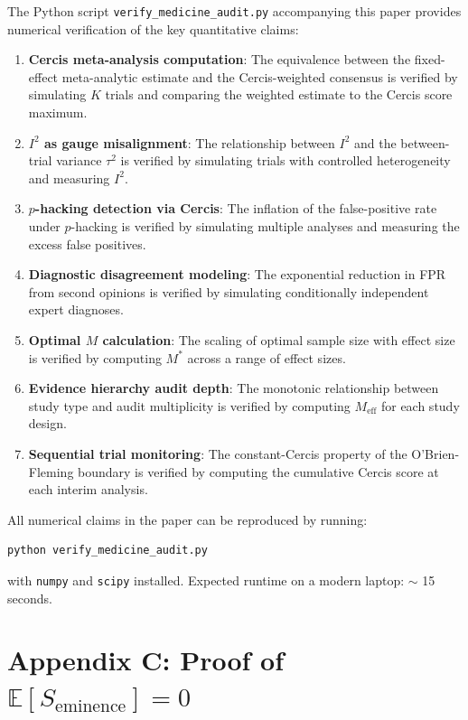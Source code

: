 \documentclass[12pt,a4paper]{article}
\theoremstyle{remark}
\newcommand{\E}{\mathbb{E}}
\begin{document}
The Python script \texttt{verify\_medicine\_audit.py} accompanying this
paper provides numerical verification of the key quantitative claims:

\begin{enumerate}[leftmargin=*, label=(\arabic*)]
  \item \textbf{Cercis meta-analysis computation}: The equivalence between
  the fixed-effect meta-analytic estimate and the Cercis-weighted consensus
  is verified by simulating $K$ trials and comparing the weighted estimate
  to the Cercis score maximum.
  \item \textbf{$I^2$ as gauge misalignment}: The relationship between
  $I^2$ and the between-trial variance $\tau^2$ is verified by
  simulating trials with controlled heterogeneity and measuring $I^2$.
  \item \textbf{$p$-hacking detection via Cercis}: The inflation of the
  false-positive rate under $p$-hacking is verified by simulating
  multiple analyses and measuring the excess false positives.
  \item \textbf{Diagnostic disagreement modeling}: The exponential
  reduction in FPR from second opinions is verified by simulating
  conditionally independent expert diagnoses.
  \item \textbf{Optimal $M$ calculation}: The scaling of optimal sample
  size with effect size is verified by computing $M^*$ across a range
  of effect sizes.
  \item \textbf{Evidence hierarchy audit depth}: The monotonic
  relationship between study type and audit multiplicity is verified
  by computing $M_{\text{eff}}$ for each study design.
  \item \textbf{Sequential trial monitoring}: The constant-Cercis
  property of the O'Brien-Fleming boundary is verified by computing
  the cumulative Cercis score at each interim analysis.
\end{enumerate}

All numerical claims in the paper can be reproduced by running:
\begin{verbatim}
python verify_medicine_audit.py
\end{verbatim}
with \texttt{numpy} and \texttt{scipy} installed. Expected runtime on a
modern laptop: $\sim$ 15 seconds.


\section*{Appendix C: Proof of $\E[S_{\text{eminence}}] = 0$}
\label{app:zero_evidence}
\end{document}
